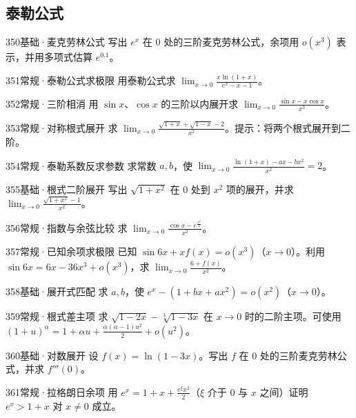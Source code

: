 \subsection{泰勒公式}
\begin{exercise}{350}{基础·麦克劳林公式}
写出 $e^x$ 在 $0$ 处的三阶麦克劳林公式，余项用 $o(x^3)$ 表示，并用多项式估算 $e^{0.1}$。
\end{exercise}
\begin{exercise}{351}{常规·泰勒公式求极限}
用泰勒公式求 $\lim_{x\to0}\frac{x\ln(1+x)}{e^x-x-1}$。
\end{exercise}
\begin{exercise}{352}{常规·三阶相消}
用 $\sin x$、$\cos x$ 的三阶以内展开求 $\lim_{x\to0}\frac{\sin x-x\cos x}{x^3}$。
\end{exercise}
\begin{exercise}{353}{常规·对称根式展开}
求 $\lim_{x\to0}\frac{\sqrt{1+x}+\sqrt{1-x}-2}{x^2}$。提示：将两个根式展开到二阶。
\end{exercise}
\begin{exercise}{354}{常规·泰勒系数反求参数}
求常数 $a,b$，使 $\lim_{x\to0}\frac{\ln(1+x)-ax-bx^2}{x^2}=2$。
\end{exercise}
\begin{exercise}{355}{基础·根式二阶展开}
写出 $\sqrt{1+x^2}$ 在 $0$ 处到 $x^2$ 项的展开，并求 $\lim_{x\to0}\frac{\sqrt{1+x^2}-1}{x^2}$。
\end{exercise}
\begin{exercise}{356}{常规·指数与余弦比较}
求 $\lim_{x\to0}\frac{\cos x-e^{\frac{x^2}{2}}}{x^2}$。
\end{exercise}
\begin{exercise}{357}{常规·已知余项求极限}
已知 $\sin6x+xf(x)=o(x^3)$（$x\to0$）。利用 $\sin6x=6x-36x^3+o(x^3)$，求 $\lim_{x\to0}\frac{6+f(x)}{x^2}$。
\end{exercise}
\begin{exercise}{358}{基础·展开式匹配}
求 $a,b$，使 $e^x-(1+bx+ax^2)=o(x^2)$（$x\to0$）。
\end{exercise}
\begin{exercise}{359}{常规·根式差主项}
求 $\sqrt{1-2x}-\sqrt[3]{1-3x}$ 在 $x\to0$ 时的二阶主项。可使用 $(1+u)^\alpha=1+\alpha u+\frac{\alpha(\alpha-1)u^2}{2}+o(u^2)$。
\end{exercise}
\begin{exercise}{360}{基础·对数展开}
设 $f(x)=\ln(1-3x)$。写出 $f$ 在 $0$ 处的三阶麦克劳林公式，并求 $f'''(0)$。
\end{exercise}
\begin{exercise}{361}{常规·拉格朗日余项}
用 $e^x=1+x+\frac{e^\xi x^2}{2}$（$\xi$ 介于 $0$ 与 $x$ 之间）证明 $e^x>1+x$ 对 $x\ne0$ 成立。
\end{exercise}
